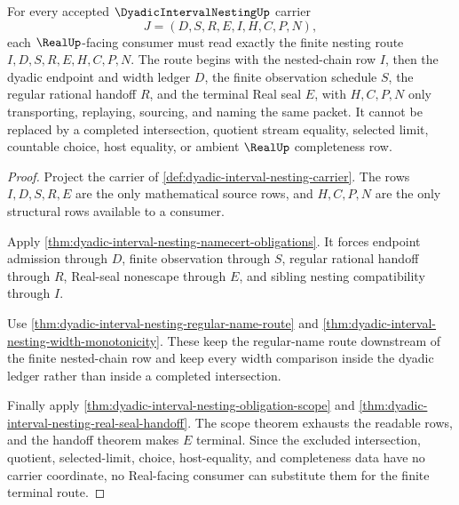 \begin{theorem}
\label{thm:dyadic-interval-nesting-terminal-seal-boundary}
For every accepted $\DyadicIntervalNestingUp$ carrier
$$
J=(D,S,R,E,I,H,C,P,N),
$$
each $\RealUp$-facing consumer must read exactly the finite nesting route $I,D,S,R,E,H,C,P,N$. The route begins with the nested-chain row $I$, then the dyadic endpoint and width ledger $D$, the finite observation schedule $S$, the regular rational handoff $R$, and the terminal Real seal $E$, with $H,C,P,N$ only transporting, replaying, sourcing, and naming the same packet. It cannot be replaced by a completed intersection, quotient stream equality, selected limit, countable choice, host equality, or ambient $\RealUp$ completeness row.
\end{theorem}
\begin{proof}
Project the carrier of \autoref{def:dyadic-interval-nesting-carrier}. The rows $I,D,S,R,E$ are the only mathematical source rows, and $H,C,P,N$ are the only structural rows available to a consumer.

Apply \autoref{thm:dyadic-interval-nesting-namecert-obligations}. It forces endpoint admission through $D$, finite observation through $S$, regular rational handoff through $R$, Real-seal nonescape through $E$, and sibling nesting compatibility through $I$.

Use \autoref{thm:dyadic-interval-nesting-regular-name-route} and \autoref{thm:dyadic-interval-nesting-width-monotonicity}. These keep the regular-name route downstream of the finite nested-chain row and keep every width comparison inside the dyadic ledger rather than inside a completed intersection.

Finally apply \autoref{thm:dyadic-interval-nesting-obligation-scope} and \autoref{thm:dyadic-interval-nesting-real-seal-handoff}. The scope theorem exhausts the readable rows, and the handoff theorem makes $E$ terminal. Since the excluded intersection, quotient, selected-limit, choice, host-equality, and completeness data have no carrier coordinate, no Real-facing consumer can substitute them for the finite terminal route.
\end{proof}


